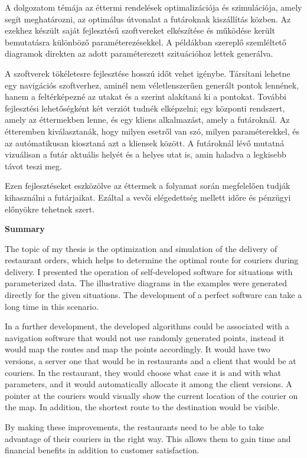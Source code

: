 
A dolgozatom témája az éttermi rendelések optimalizációja és szimulációja, amely segít meghatározni, az optimálus útvonalat a futároknak kiszállítás közben. Az ezekhez készült saját fejlesztésű szoftvereket elkészítése és működése került bemutatásra különböző paraméterezésekkel. A példákban szereplő szemléltető diagramok direkten az adott paraméterezett szituációhoz lettek generálva.

A szoftverek tökéletesre fejlesztése hosszú időt vehet igénybe. Társítani lehetne egy navigációs szoftverhez, aminél nem véletlenszerűen generált pontok lennének, hanem a feltérképezné az utakat és a szerint alakítaná ki a pontokat. További fejlesztési lehetőségként két verziót tudnék elképzelni; egy központi rendszert, amely az éttermekben lenne, és egy kliens alkalmazást, amely a futároknál. Az étteremben kiválasztanák, hogy milyen esetről van szó, milyen paraméterekkel, és az autómatikusan kiosztaná azt a kliensek között. A futároknál lévő mutatná vizuálisan a futár aktuális helyét és a helyes utat is, amin haladva a legkisebb távot teszi meg.

Ezen fejlesztéseket eszközölve az éttermek a folyamat során megfelelően tudják kihasználni a futárjaikat. Ezáltal a vevői elégedettség mellett időre és pénzügyi előnyökre tehetnek szert.

\newpage

\textbf{Summary}

\bigskip

The topic of my thesis is the optimization and simulation of the delivery of restaurant orders, which helps to determine the optimal route for couriers during delivery. I presented the operation of self-developed software for situations with parameterized data. The illustrative diagrams in the examples were generated directly for the given situations. The development of a perfect software can take a long time in this scenario.

In a further development, the developed algorithms could be associated with a navigation software that would not use randomly generated points, instead it would map the routes and map the points accordingly. It would have two versions, a server one that would be in restaurants and a client that would be at couriers. In the restaurant, they would choose what case it is and with what parameters, and it would automatically allocate it among the client versions. A pointer at the couriers would visually show the current location of the courier on the map. In addition, the shortest route to the destination would be visible.

By making these improvements, the restaurants need to be able to take advantage of their couriers in the right way. This allows them to gain time and financial benefits in addition to customer satisfaction.